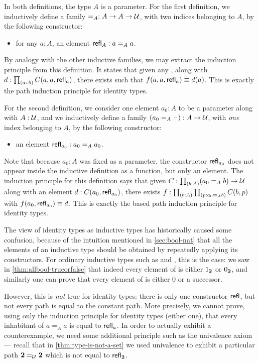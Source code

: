 In both definitions, the type $A$ is a parameter.
For the first definition, we inductively define a family $=_A : A\to A\to \mathcal{U}$, with two indices belonging to $A$, by the following constructor:
\begin{itemize}
\item for any $a:A$, an element $\mathsf{refl}_{A} : a=_A a$.
\end{itemize}
By analogy with the other inductive families, we may extract the induction principle from this definition.
It states that given any , along with $d:\prd{a:A} C(a,a,\refl{a})$, there exists  such that $f(a,a,\mathsf{refl}_{a})\equiv d(a)$.
This is exactly the path induction principle for identity types.

For the second definition, we consider one element $a_0:A$ to be a parameter along with $A:\mathcal{U}$, and we inductively define a family $(a_0 =_A \mathord{\hspace{1pt}\text{--}\hspace{1pt}}):A\to \mathcal{U}$, with \emph{one} index belonging to $A$, by the following constructor:
\begin{itemize}
\item an element $\mathsf{refl}_{a_0} : a_0 =_A a_0$.
\end{itemize}
Note that because $a_0:A$ was fixed as a parameter, the constructor $\mathsf{refl}_{a_0}$ does not appear inside the inductive definition as a function, but only an element.
The induction principle for this definition says that given $C:\prd{b:A} (a_0 =_A b) \to \type$ along with an element $d:C(a_0,\mathsf{refl}_{a_0})$, there exists $f:\prd{b:A}{p:a_0 =_A b} C(b,p)$ with $f(a_0,\mathsf{refl}_{a_0})\equiv d$.
This is exactly the based path induction principle for identity types.

The view of identity types as inductive types has historically caused some confusion, because of the intuition mentioned in \autoref{sec:bool-nat} that all the elements of an inductive type should be obtained by repeatedly applying its constructors.
For ordinary inductive types such as \bool and \nat, this is the case: we saw in \autoref{thm:allbool-trueorfalse} that indeed every element of \bool is either ${1_{\mathbf{2}}}$ or ${0_{\mathbf{2}}}$, and similarly one can prove that every element of \nat is either $0$ or a successor.

However, this is \emph{not} true for identity types: there is only one constructor $\mathsf{refl}_{}$, but not every path is equal to the constant path.
More precisely, we cannot prove, using only the induction principle for identity types (either one), that every inhabitant of $a=_A a$ is equal to $\mathsf{refl}_{a}$.
In order to actually exhibit a counterexample, we need some additional principle such as the univalence axiom --- recall that in \autoref{thm:type-is-not-a-set} we used univalence to exhibit a particular path $\mathbf{2}=_\mathcal{U}\mathbf{2}$ which is not equal to $\mathsf{refl}_{\mathbf{2}}$.

